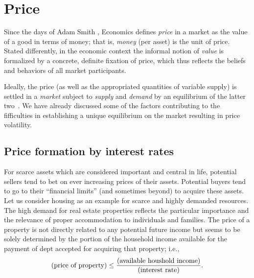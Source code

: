 \documentclass[aps,rmp,preprint,amsfonts,showpacs,showkeys]{revtex4}
\begin{document}






\section{Price}

Since the days of Adam Smith \cite{1776-smith-wealthofnations},
Economics \cite{1948-Samuelson,Begg} defines {\em price} in a market as the value of a good in terms of money;
that is, {\em money} (per asset) is the unit of price.
Stated differently, in the economic context the informal notion of {\em value} is formalized by a concrete,
definite fixation of price,
which thus reflects the beliefs and behaviors of all market participants.

Ideally, the price (as well as the appropriated quantities of variable supply)
is settled in a {\em market} subject to {\em supply} and {\em demand}
by an equilibrium of the latter two~\cite{1874-walras,1890-marshall}.
We have already discussed some of the factors contributing to the fifficulties in establishing a unique
equilibrium on the market resulting in price volatility.


\subsection{Price formation by interest rates}
For scarce assets which are considered important and central in life,
potential sellers tend to bet on ever increasing prices of their assets.
Potential buyers tend to go to their ``financial limits'' (and sometimes beyond) to acquire these assets.
Let us consider housing as an example for scarce and highly demanded resources.
The high demand for real estate properties reflects the particular importance and the relevance  of proper accommodation to individuals and families.
The price of a property
is not directly related to any potential future income
but seems to be solely determined by the portion of the household income available
for the payment of dept accepted for acquiring that property; i.e.,
$$
\mbox{(price of property)}
\le
{
\mbox{(available houshold income)}
\over
\mbox{(interest rate)}
}       .
$$
\end{document}

